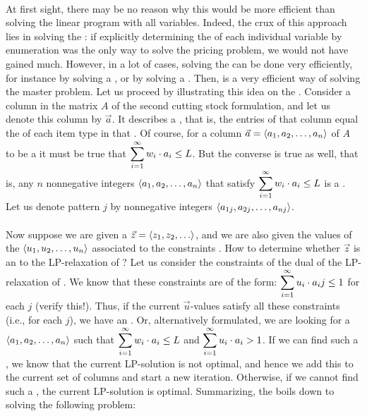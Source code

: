 \paragraph{}
At first sight, there may be no reason why this would be more efficient than solving the linear program with all variables. Indeed, the crux of this approach lies in solving the : if explicitly determining the  of each individual variable by enumeration was the only way to solve the pricing problem, we would not have gained much. However, in a lot of cases, solving the  can be done very efficiently, for instance by solving a , or by solving a . Then,  is a very efficient way of solving the master problem. Let us proceed by illustrating this idea on the . Consider a column in the matrix $A$ of the second cutting stock formulation, and let us denote this column by $\vec{a}$. It describes a , that is, the entries of that column equal the  of each item type in that . Of course, for a column $\vec{a}=\tupl{a_1,a_2,\ldots,a_n}$ of $A$ to be a  it must be true that $\sumieqb[i]{1}{\infty}w_i\cdot a_i\leq L$. But the converse is true as well, that is, any $n$ nonnegative integers $\tupl{a_1,a_2,\ldots,a_n}$ that satisfy $\sumieqb[i]{1}{\infty}w_i\cdot a_i\leq L$ is a . Let us denote pattern $j$ by nonnegative integers $\tupl{a_{1j},a_{2j},\ldots,a_{nj}}$.

\paragraph{}
Now suppose we are given a  $\vec{z}=\tupl{z_1,z_2,\ldots}$, and we are also given the values of the  $\tupl{u_1,u_2,\ldots,u_n}$ associated to the constraints . How to determine whether $\vec{z}$ is an  to the LP-relaxation of ? Let us consider the constraints of the dual of the LP-relaxation of . We know that these constraints are of the form: $\sumieqb[i]{1}{\infty}u_i\cdot a_ij\leq1$ for each  $j$ (verify this!). Thus, if the current $\vec{u}$-values satisfy all these constraints (i.e., for each  $j$), we have an . Or, alternatively formulated, we are looking for a  $\tupl{a_1,a_2,\ldots,a_n}$ such that $\sumieqb[i]{1}{\infty}w_i\cdot a_i\leq L$ and $\sumieqb[i]{1}{\infty}u_i\cdot a_i>1$. If we can find such a , we know that the current LP-solution is not optimal, and hence we add this  to the current set of columns and start a new iteration. Otherwise, if we cannot find such a , the current LP-solution is optimal. Summarizing, the  boils down to solving the following problem:

